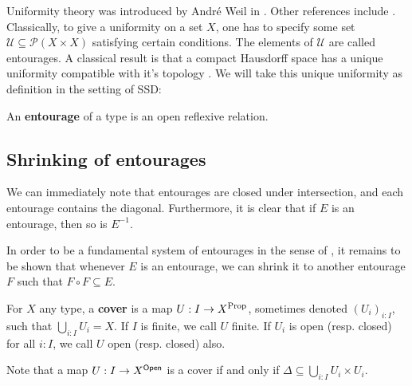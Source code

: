 Uniformity theory was introduced by Andr\'e Weil in \cite{Weil}. Other references include \cite{Tukey, BourbakiTopologyCh1To4, Howes, Isbell}. 
Classically, to give a uniformity on a set $X$, one has to specify some set $\mathcal U \subseteq \mathcal P(X\times X)$ satisfying certain conditions. The elements of $\mathcal U$ are called entourages.  
A classical result is that a compact Hausdorff space has a unique uniformity compatible with it's topology \parencite[Theorem II.4.1.1]{BourbakiTopologyCh1To4}. We will take this unique uniformity as definition in the setting of SSD:
\begin{definition}\label{DfnEntourage}
  An \textbf{entourage} of a type is an open reflexive relation. 
\end{definition}
\subsection{Shrinking of entourages}
\begin{remark}
  We can immediately note that entourages are closed under intersection, and each entourage contains the diagonal. Furthermore, it is clear that if $E$ is an entourage, then so is $E^{-1}$. 
\end{remark}
In order to be a fundamental system of entourages in the sense of \parencite[170]{BourbakiTopologyCh1To4}, it remains to be shown that whenever $E$ is an entourage, we can shrink it to another entourage $F$ such that $F\circ F \subseteq E$. 
\begin{definition}
  For $X$ any type, a \textbf{cover} is a map $U:I \to X^{\mathrm{Prop}}$, sometimes denoted $(U_i)_{i:I}$, such that $\bigcup_{i:I} U_i = X$. 
  If $I$ is finite, we call $U$ finite. If $U_i$ is open (resp. closed) for all $i:I$, we call $U$ open (resp. closed) also. 
\end{definition}
\begin{remark}
  Note that a map $U:I \to X^{\mathsf{Open}}$ is a cover if and only if $\Delta \subseteq \bigcup_{i:I} U_i \times U_i$. 
\end{remark}

